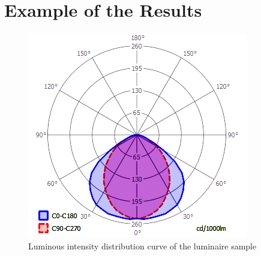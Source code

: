 \section{Example of the Results}

\begin{figure}[htb]
  \centering
  \includegraphics[width=0.7\columnwidth]{IDiag}
  \caption{Luminous intensity distribution curve of the luminaire sample}
  \label{fig:IDiag}
\end{figure}

